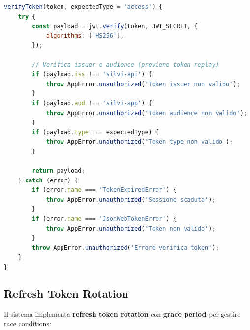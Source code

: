 \documentclass[11pt,a4paper]{article}
\begin{document}
\begin{lstlisting}[language=JavaScript, caption={Token Verification con Claims Check}]
verifyToken(token, expectedType = 'access') {
    try {
        const payload = jwt.verify(token, JWT_SECRET, {
            algorithms: ['HS256'],
        });
        
        // Verifica issuer e audience (previene token replay)
        if (payload.iss !== 'silvi-api') {
            throw AppError.unauthorized('Token issuer non valido');
        }
        if (payload.aud !== 'silvi-app') {
            throw AppError.unauthorized('Token audience non valido');
        }
        if (payload.type !== expectedType) {
            throw AppError.unauthorized('Token type non valido');
        }
        
        return payload;
    } catch (error) {
        if (error.name === 'TokenExpiredError') {
            throw AppError.unauthorized('Sessione scaduta');
        }
        if (error.name === 'JsonWebTokenError') {
            throw AppError.unauthorized('Token non valido');
        }
        throw AppError.unauthorized('Errore verifica token');
    }
}
\end{lstlisting}

\subsection{Refresh Token Rotation}

Il sistema implementa \textbf{refresh token rotation} con \textbf{grace period} per gestire race conditions:
\end{document}
